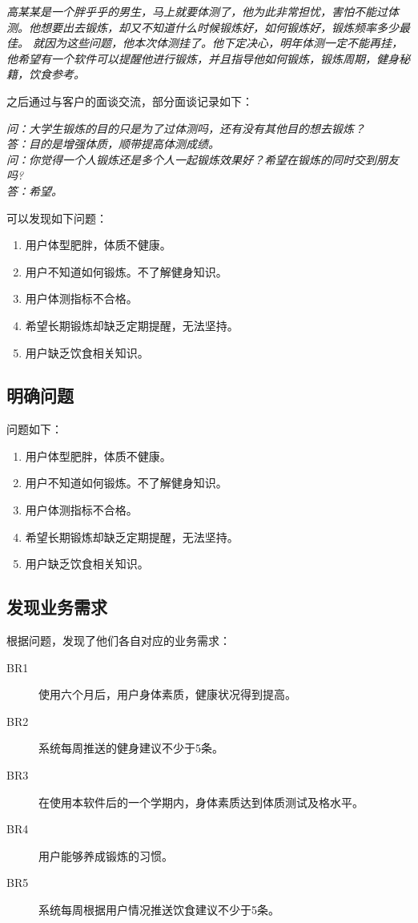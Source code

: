\documentclass[UTF8]{ctexart}
\begin{document}
\begin{displayquote}
\textit{高某某是一个胖乎乎的男生，马上就要体测了，他为此非常担忧，害怕不能过体测。他想要出去锻炼，却又不知道什么时候锻炼好，如何锻炼好，锻炼频率多少最佳。
就因为这些问题，他本次体测挂了。他下定决心，明年体测一定不能再挂，他希望有一个软件可以提醒他进行锻炼，并且指导他如何锻炼，锻炼周期，健身秘籍，饮食参考。}
\end{displayquote}

之后通过与客户的面谈交流，部分面谈记录如下：

\begin{displayquote}
\textit{问：大学生锻炼的目的只是为了过体测吗，还有没有其他目的想去锻炼？\\
答：目的是增强体质，顺带提高体测成绩。\\
问：你觉得一个人锻炼还是多个人一起锻炼效果好？希望在锻炼的同时交到朋友吗?\\
答：希望。
}
\end{displayquote}

可以发现如下问题：

 \begin{enumerate}
    \item 用户体型肥胖，体质不健康。
    \item 用户不知道如何锻炼。不了解健身知识。
    \item 用户体测指标不合格。
    \item 希望长期锻炼却缺乏定期提醒，无法坚持。
    \item 用户缺乏饮食相关知识。
 \end{enumerate}
\subsection{明确问题}
问题如下：
\begin{enumerate}
   \item 用户体型肥胖，体质不健康。
   \item 用户不知道如何锻炼。不了解健身知识。
   \item 用户体测指标不合格。
   \item 希望长期锻炼却缺乏定期提醒，无法坚持。
   \item 用户缺乏饮食相关知识。
\end{enumerate}
\subsection{发现业务需求}
根据问题，发现了他们各自对应的业务需求：
\begin{description}
   \item[BR1] 使用六个月后，用户身体素质，健康状况得到提高。
   \item[BR2] 系统每周推送的健身建议不少于5条。
   \item[BR3] 在使用本软件后的一个学期内，身体素质达到体质测试及格水平。
   \item[BR4] 用户能够养成锻炼的习惯。
   \item[BR5] 系统每周根据用户情况推送饮食建议不少于5条。
\end{description}
\end{document}
